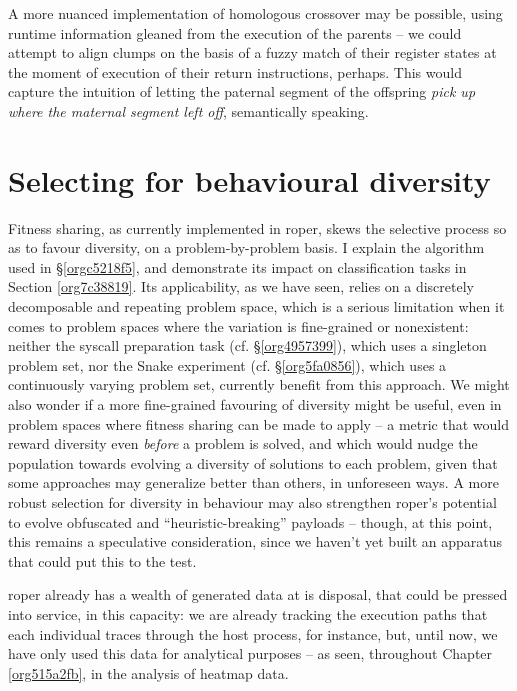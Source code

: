 \documentclass[12pt,glossary]{dalthesis}
\begin{document}
A more nuanced implementation of homologous crossover may be possible, using
runtime information gleaned from the execution of the parents -- we could
attempt to align clumps on the basis of a fuzzy match of their register states
at the moment of execution of their return instructions, perhaps. This would
capture the intuition of letting the paternal segment of the offspring \emph{pick up
where the maternal segment left off}, semantically speaking.


\section{Selecting for behavioural diversity}
\label{sec:orgbe7c9bc}
\label{org772389d}

Fitness sharing, as currently implemented in \gls{roper}, skews the selective process
so as to favour diversity, on a problem-by-problem basis. I explain the algorithm
used in \S \ref{orgc5218f5}, and demonstrate its impact on classification tasks in 
Section \ref{org7c38819}. Its applicability, as we have seen, relies
on a discretely decomposable and repeating problem space, which is a serious limitation
when it comes to problem spaces where the variation is fine-grained or nonexistent:
neither the syscall preparation task (cf. \S \ref{org4957399}), which uses a
singleton problem set, nor the
Snake experiment (cf. \S \ref{org5fa0856}), which uses a continuously
varying problem set, currently benefit from this approach. We might also wonder if
a more fine-grained favouring of diversity might be useful, even in problem spaces
where fitness sharing can be made to apply -- a metric that would reward diversity
even \emph{before} a problem is solved, and which would nudge the population towards
evolving a diversity of solutions to each problem, given that some approaches may
generalize better than others, in unforeseen ways. A more robust selection for
diversity in behaviour may also strengthen \gls{roper}'s potential to evolve 
obfuscated and ``heuristic-breaking'' payloads -- though, at this point, this remains
a speculative consideration, since we haven't yet built an apparatus that could
put this to the test. 

\Gls{roper} already has a wealth of generated data at is disposal, that could be
pressed into service, in this capacity: we are already tracking the execution
paths that each individual traces through the host process, for instance, but,
until now, we have only used this data for analytical purposes -- as seen,
throughout Chapter \ref{org515a2fb}, in the analysis of heatmap data. 
\end{document}
